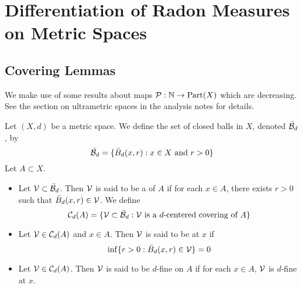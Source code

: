 \documentclass{book}
\begin{document}
	









	
	
	
	
	
	
	
	
	
	
	
	
	
	
	
	
	
	
	
	
	
	
	
	
	
	
	
	
	
	
	
	
	
	
	
	
	
	
	
	
	
	
	
	
	
	
	\newpage
	\section{Differentiation of Radon Measures on Metric Spaces}
	
	\subsection{Covering Lemmas}
	
	
	\begin{note}
		We make use of some results about maps $\mathcal{P}: \mathbb{N} \rightarrow \operatorname*{\text{Part}}(X)$ which are decreasing. See the section on ultrametric spaces in the analysis notes for details. 
	\end{note}
	
	\begin{defn} 
		Let $(X,d)$ be a metric space. We define the set of closed balls in $X$, denoted $\bar{\mathcal{B}}_d$, by
		$$\bar{\mathcal{B}}_d =  \{\bar{B}_d(x, r): x \in X \text{ and } r > 0\}$$
		Let $A \subset X$. 
		\begin{itemize}
			\item Let $\mathcal{V} \subset \bar{\mathcal{B}}_d$. Then $\mathcal{V}$ is said to be a  of $A$ if for each $x \in A$, there exists $r > 0$ such that $\bar{B}_d(x, r) \in \mathcal{V}$. We define 
			$$\mathcal{C}_d(A) = \{ \mathcal{V} \subset \bar{\mathcal{B}}_d: \mathcal{V} \text{ is a $d$-centered covering of } A\}$$
			\item Let $\mathcal{V} \in \mathcal{C}_d(A)$ and $x \in A$. Then $\mathcal{V}$ is said to be  at $x$ if 
			$$\inf \{r > 0 : \bar{B}_d(x,r) \in \mathcal{V}\} = 0$$
			\item Let $\mathcal{V} \in \mathcal{C}_d(A)$. Then $\mathcal{V}$ is said to be $d$-fine on $A$ if for each $x \in A$, $\mathcal{V}$ is $d$-fine at $x$.
		\end{itemize}
	\end{defn}
	
\end{document}
